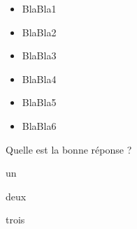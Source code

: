 \begin{acquis}
\begin{itemize}
\item BlaBla1
\item BlaBla2
\item BlaBla3
\item BlaBla4
\item BlaBla5
\item BlaBla6
\end{itemize}
\end{acquis}

\begin{QCM}
  \begin{GroupeQCM} %
    \begin{exercice}
      Quelle est la bonne réponse ?
      \begin{ChoixQCM}{4}
      \item un
      \item deux
      \item trois
      \end{ChoixQCM}
\begin{corrige}
   \end{corrige}
    \end{exercice}


\end{GroupeQCM}
\end{QCM}

  